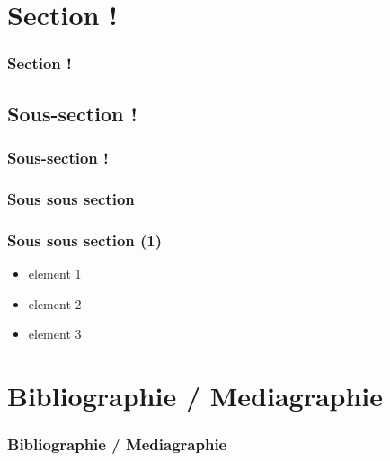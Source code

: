 \documentclass[slidetop,11pt]{beamer}
\begin{document}
\section{Section !}
\begin{frame}
	\frametitle{Section !}
	\tableofcontents[sections=3,currentsection,subsectionstyle=show/shaded/hide] %
\end{frame} 

\subsection{Sous-section !}
\begin{frame}
	\frametitle{Sous-section ! }
	\tableofcontents[sections=3,currentsection,subsectionstyle=show/shaded/hide]
\end{frame} 

\subsubsection{Sous sous section}
\begin{frame}
	\frametitle{Sous sous section  (1)}
	\begin{itemize}
		\item element 1
		\item element 2
		\item element 3
	\end{itemize}
\end{frame} 

\def\sectionPartBibliographie{Bibliographie / Mediagraphie}
\section{\sectionPartBibliographie}
\begin{frame}
	\frametitle{\sectionPartBibliographie}
	\nocite{*}
	
	
\end{frame}
\end{document}
